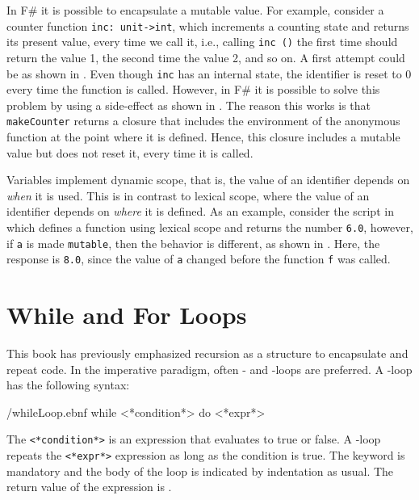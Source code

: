 \documentclass[fsharpNotes.tex]{subfiles}
\begin{document}
In F\# it is possible to encapsulate a mutable value. For example, consider a counter function \lstinline{inc: unit->int}, which increments a counting state and returns its present value, every time we call it, i.e., calling \lstinline{inc ()} the first time should return the value 1, the second time the value 2, and so on. A first attempt could be as shown in . 
%
%
Even though \lstinline{inc} has an internal state, the identifier  is reset to 0 every time the function is called. However, in F\# it is possible to solve this problem by using a side-effect as shown in .
%
%
The reason this works is that \lstinline{makeCounter} returns a closure that includes the environment of the anonymous function at the point where it is defined. Hence, this closure includes a mutable value but does not reset it, every time it is called.


Variables implement dynamic scope, that is, the value of an identifier depends on \emph{when} it is used. This is in contrast to lexical scope, where the value of an identifier depends on \emph{where} it is defined. As an example, consider the script in  which defines a function using lexical scope and returns the number \lstinline!6.0!, however, if \lstinline!a! is made \lstinline!mutable!, then the behavior is different, as shown in .
%
%
Here, the response is \lstinline!8.0!, since the value of \lstinline!a! changed before the function \lstinline!f! was called.

\section{While and For Loops}
\label{chap:flow}
This book has previously emphasized recursion as a structure to encapsulate and repeat code. In the imperative paradigm, often - and -loops are preferred. A -loop has the following syntax:
%
\begin{verbatimwrite}{\ebnf/whileLoop.ebnf}
while <*condition*> do
  <*expr*>
\end{verbatimwrite}
%
The  \lstinline[language=syntax]{<*condition*>} is an expression that evaluates to true or false. A -loop repeats the \lstinline[language=syntax]{<*expr*>} expression as long as the condition is true.  The  keyword is mandatory and the body of the loop is indicated by indentation as usual. The return value of the  expression is \lexeme{()}.
\end{document}
